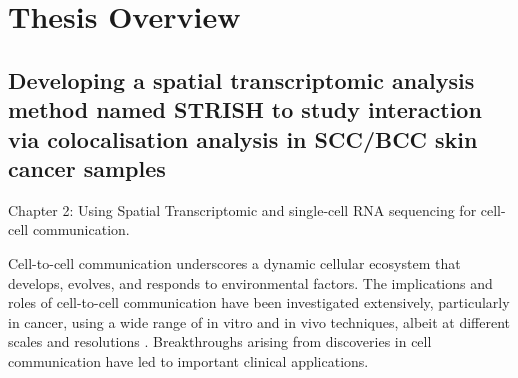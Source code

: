 \section{Thesis Overview}
\subsection{Developing a spatial transcriptomic analysis method named STRISH to study interaction via colocalisation analysis in SCC/BCC skin cancer samples}

Chapter 2: Using Spatial Transcriptomic and single-cell RNA sequencing for cell-cell communication. 

Cell-to-cell communication underscores a dynamic cellular ecosystem that develops, evolves, and responds to environmental factors. The implications and roles of cell-to-cell communication have been investigated extensively, particularly in cancer, using a wide range of in vitro and in vivo techniques, albeit at different scales and resolutions \cite{brucher2014cell}. Breakthroughs arising from discoveries in cell communication have led to important clinical applications. 

